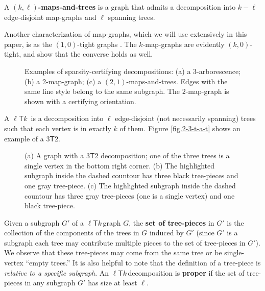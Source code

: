 \documentclass[Svgc,nospthms]{Svgc}
\newcommand{\ellteekay}{\ensuremath{\ell{\mathsf T}k}\,}
\newcommand{\reffig}[1]{Figure \ref{fig.#1}}
\begin{document}
	
	A {\bf $(k,\ell)$-maps-and-trees} is a graph that admits a decomposition into $k-\ell$ 
	edge-disjoint map-graphs and $\ell$ spanning trees.
	
Another characterization of map-graphs, which we will use extensively in this paper, is as the $(1,0)$-tight graphs \cite{whiteley:union-matroids,maps}. The $k$-map-graphs are evidently $(k,0)$-tight, and \cite{whiteley:union-matroids,maps} show that the converse holds as well. 

\begin{figure}[htbp]
	\centering
	\hspace{.3in}
	\hspace{.3 in}
	\caption{Examples of sparsity-certifying decompositions: (a) a $3$-arborescence; (b) a 2-map-graph;  (c)  a $(2,1)$-maps-and-trees.  Edges with the same line style belong to the 
	same subgraph.  The 2-map-graph is shown with a certifying orientation.}
	\end{figure}





A \ellteekay 
is a decomposition into $\ell$ edge-disjoint (not necessarily spanning) trees such that each vertex is in 
exactly $k$ of them.  \reffig{2-3-t-a-t} shows an example of a $3{\mathsf T}2$.

\begin{figure}[htbp]
	\centering
	\subfigure[]{\texttt{[image: 2-3-t-a-t]}\label{fig.2-3-t-a-t}}
\subfigure[]{\texttt{[image: 2-3-t-a-t-b]}\label{fig.2-3-t-a-t-b}}
\subfigure[]{\texttt{[image: 2-3-t-a-t-c]}\label{fig.2-3-t-a-t-c}}
	\caption{(a) A graph with a $3\mathsf{T}2$ decomposition; one of the three trees is 
	a single vertex in the bottom right corner.  (b) The highlighted subgraph inside the dashed 
	countour has three black tree-pieces and one gray tree-piece.  (c) The highlighted subgraph inside 
	the dashed countour	has three gray tree-pieces (one is a single vertex) and one black tree-piece.}
	\end{figure}

	Given a subgraph $G'$ of a \ellteekay graph $G$, the {\bf set of tree-pieces} in $G'$ is 
	the collection of the components of the trees in $G$ induced by $G'$ (since $G'$
	is a subgraph each tree may contribute multiple pieces to the set of tree-pieces in $G'$). 
	We observe that these tree-pieces may come from the same tree or be single-vertex ``empty trees.'' 
	It is also helpful to note that the definition of a tree-piece is {\it relative to a specific 
	subgraph}.  An \ellteekay decomposition is \textbf{proper} if the set of tree-pieces in any 
	subgraph $G'$ has size at least $\ell$.
	
\end{document}
